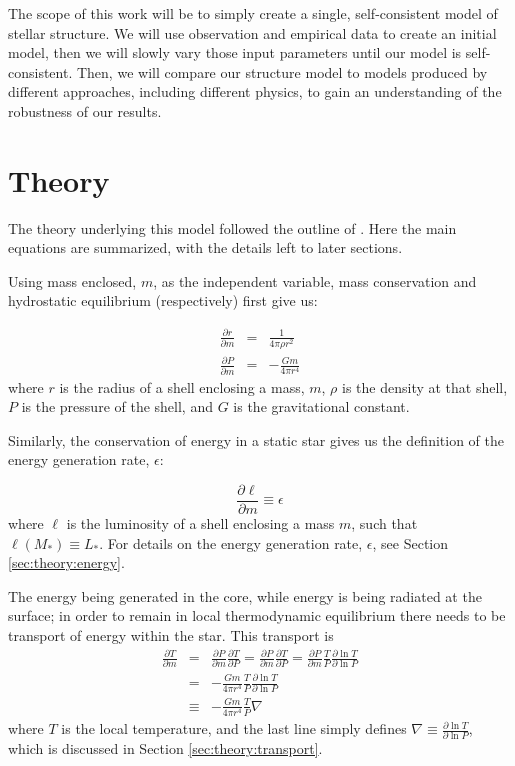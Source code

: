 The scope of this work will be to simply create a single, self-consistent model of stellar structure.  We will use observation and empirical data to create an initial model, then we will slowly vary those input parameters until our model is self-consistent. Then, we will compare our structure model to models produced by different approaches, including different physics, to gain an understanding of the robustness of our results.


\section{Theory}
\label{sec:theory}
The theory underlying this model followed the outline of \citet[Chapter 10]{KippenhahnWeigertWeiss}.  Here the main equations are summarized, with the details left to later sections.

Using mass enclosed, $m$, as the independent variable, mass conservation and hydrostatic equilibrium (respectively) first give us:

\begin{eqnarray}
  \frac{\partial r}{\partial m} &=& \frac{1}{4 \pi \rho r^2} 
   \label{eq:drdm} \\
  \frac{\partial P}{\partial m} &=& - \frac{G m}{4 \pi r^4}
   \label{eq:dPdm}
\end{eqnarray}
where $r$ is the radius of a shell enclosing a mass, $m$, $\rho$ is the density at that shell, $P$ is the pressure of the shell, and $G$ is the gravitational constant.

Similarly, the conservation of energy in a static star gives us the definition of the energy generation rate, $\epsilon$:

\begin{equation}
  \frac{\partial \ell}{\partial m} \equiv \epsilon
   \label{eq:dldm}
\end{equation}
where $\ell$ is the luminosity of a shell enclosing a mass $m$, such that $\ell\left(M_\ast\right) \equiv L_\ast$.
For details on the energy generation rate, $\epsilon$, see Section \ref{sec:theory:energy}.

The energy being generated in the core, while energy is being radiated at the surface; in order to remain in local thermodynamic equilibrium there needs to be transport of energy within the star.  This transport is 
\begin{eqnarray}
  \frac{\partial T}{\partial m} &=& \frac{\partial P}{\partial m} \frac{\partial T}{\partial P} = \frac{\partial P}{\partial m} \frac{\partial T}{\partial P}  = \frac{\partial P}{\partial m}\frac{T}{P} \frac{ \partial\ln T}{ \partial \ln P} \nonumber \\
  &=& - \frac{G m}{4 \pi r^4} \frac{T}{P} \frac{ \partial\ln T}{ \partial \ln P} \nonumber \\
  &\equiv& - \frac{G m}{4 \pi r^4} \frac{T}{P} \nabla 
   \label{eq:dTdm}
\end{eqnarray}
where $T$ is the local temperature, and the last line simply defines $\nabla \equiv \frac{\partial \ln T}{\partial \ln P}$, which is discussed in Section \ref{sec:theory:transport}.

